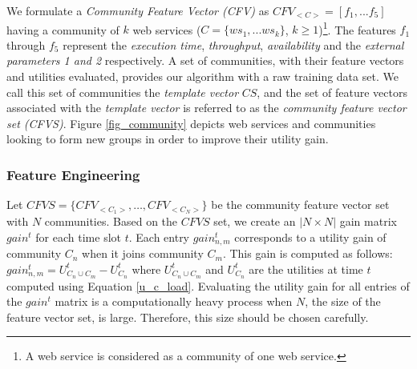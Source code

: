 We formulate a \emph{Community Feature Vector (CFV)} as $CFV_{<C>} = [f_1,...f_5]$ having a community of $k$ web services ($C = \{ws_1,...ws_k\}$, $k \geq 1$)\footnote{A web service is considered as a community of one web service.}. The features $f_1$ through $f_5$ represent the \emph{execution time}, \emph{throughput}, \emph{availability} and the \emph{external parameters 1 and 2} respectively. A set of communities, with their feature vectors and utilities evaluated, provides our algorithm with a raw training data set. We call this set of communities the \emph{template vector} $CS$, and the set of feature vectors associated with the \emph{template vector} is referred to as the \emph{community feature vector set (CFVS)}. Figure \ref{fig_community} depicts web services and communities looking to form new groups in order to improve their utility gain.

\subsubsection{Feature Engineering}\label{sss:feng}
Let $CFVS = \{CFV_{<C_1>}, \dots, CFV_{<C_N>}\}$ be the community feature vector set with $N$ communities. Based on the $CFVS$ set, we create an $|N \times N|$ gain matrix $gain^{t}$ for each time slot $t$. Each entry $gain_{n,m}^{t}$ corresponds to a utility gain of community $C_n$ when it joins community $C_m$. This gain is computed as follows: $gain_{n,m}^{t} = U_{C_n \cup C_m}^{t} - U_{C_{n}}^{t}$ where $U_{C_n \cup C_m}^{t}$ and $U_{C_{n}}^{t}$ are the utilities at time $t$ computed using Equation \ref{u_c_load}.  Evaluating the utility gain for all entries of the $gain^t$ matrix is a computationally heavy process when $N$, the size  of the feature vector set, is large. Therefore, this size should be chosen carefully.

